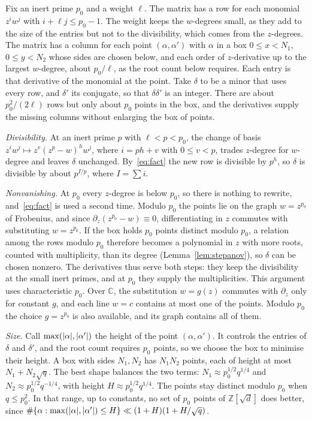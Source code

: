 \documentclass[11pt]{amsart}
\theoremstyle{remark}
\newcommand{\Z}{\mathbb{Z}}
\newcommand{\sd}{\sqrt{d}}
\newcommand{\C}{\mathbb{C}}
\DeclarePairedDelimiter\abs{\lvert}{\rvert}
\begin{document}
Fix an inert prime $p_0$ and a weight $\ell$. The matrix has a row for each monomial $z^iw^j$ with
$i+\ell j\le p_0-1$. The weight keeps the $w$-degrees small, as they add to the size of the entries but not
to the divisibility, which comes from the $z$-degrees. The matrix has a column for each point
$(\alpha,\alpha')$ with $\alpha$ in a box $0\le x<N_1$, $0\le y<N_2$ whose sides are chosen below, and each order of $z$-derivative up to
the largest $w$-degree, about $p_0/\ell$, as the root count below requires. Each entry is that derivative of
the monomial at the point. Take $\delta$ to be a minor that uses every row, and $\delta'$
its conjugate, so that $\delta\delta'$ is an integer. There are about $p_0^2/(2\ell)$ rows but only about $p_0$ points in the box, and the
derivatives supply the missing columns without enlarging the box of points.

\emph{Divisibility.} At an inert prime $p$ with $\ell<p<p_0$, the change of basis
$z^iw^j\mapsto z^v(z^p-w)^hw^j$, where $i=ph+v$ with $0\le v<p$, trades $z$-degree for $w$-degree and leaves $\delta$
unchanged. By~\eqref{eq:fact} the new row is divisible by $p^h$, so $\delta$ is divisible by
about $p^{I/p}$, where $I=\sum i$.

\emph{Nonvanishing.} At $p_0$ every $z$-degree is below $p_0$, so there is nothing to rewrite,
and~\eqref{eq:fact} is used a second time. Modulo $p_0$ the points lie on the graph $w=z^{p_0}$ of
Frobenius, and since $\partial_z(z^{p_0}-w)\equiv0$, differentiating in $z$ commutes with substituting
$w=z^{p_0}$. If the box holds $p_0$ points distinct modulo $p_0$, a relation among the rows modulo $p_0$ therefore
becomes a polynomial in $z$ with more roots,
counted with multiplicity, than its degree (Lemma~\ref{lem:stepanov}), so $\delta$ can be chosen nonzero.
The derivatives thus serve both steps: they keep the divisibility at the small inert primes, and at $p_0$ they
supply the multiplicities. This argument uses characteristic $p_0$. Over $\C$, the
substitution $w=g(z)$ commutes with $\partial_z$ only for constant $g$, and each line $w=c$ contains at
most one of the points. Modulo $p_0$ the choice $g=z^{p_0}$ is also available, and its graph contains
all of them.

\emph{Size.} Call $\max(\abs{\alpha},\abs{\alpha'})$ the height of the point $(\alpha,\alpha')$. It
controls the entries of $\delta$ and $\delta'$, and the root count requires $p_0$ points, so we choose the
box to minimise their height. A box with sides $N_1,N_2$ has $N_1N_2$ points, each of height at most
$N_1+N_2\sqrt q$. The best shape balances the two terms: $N_1\approx p_0^{1/2}q^{1/4}$ and
$N_2\approx p_0^{1/2}q^{-1/4}$, with height $H\approx p_0^{1/2}q^{1/4}$. The points stay distinct modulo
$p_0$ when $q\le p_0^2$. In that range,
up to constants, no set of $p_0$ points of $\Z[\sd]$ does better, since
$\#\{\alpha:\max(\abs{\alpha},\abs{\alpha'})\le H\}\ll(1+H)(1+H/\sqrt q)$.
\end{document}

